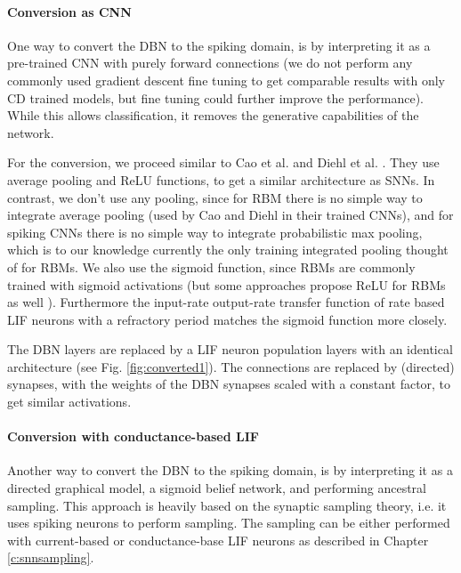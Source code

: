 \paragraph{Conversion as CNN}  \label{c:convascnn}

One way to convert the DBN to the spiking domain, is by interpreting it as a pre-trained CNN with purely forward connections (we do not perform any commonly used gradient descent fine tuning to get comparable results with only CD trained models, but fine tuning could further improve the performance).
While this allows classification, it removes the generative capabilities of the network.

For the conversion, we proceed similar to Cao et al. and Diehl et al. \cite{Cao2014} \cite{Diehl2015} .
They use average pooling and ReLU functions, to get a similar architecture as SNNs.
In contrast, we don't use any pooling, since for RBM there is no simple way to integrate average pooling (used by Cao and Diehl in their trained CNNs), and for spiking CNNs there is no simple way to integrate probabilistic max pooling, which is to our knowledge currently the only training integrated pooling thought of for RBMs.
We also use the sigmoid function, since RBMs are commonly trained with sigmoid activations (but some approaches propose ReLU for RBMs as well \cite{Nair2010}).
Furthermore the input-rate output-rate transfer function of rate based LIF neurons with a refractory period matches the sigmoid function more closely.

The DBN layers are replaced by a LIF neuron population layers with an identical architecture (see Fig. \ref{fig:converted1}). 
The connections are replaced by (directed) synapses, with the weights of the DBN synapses scaled with a constant factor, to get similar activations.
 

\paragraph{Conversion with conductance-based LIF} \label{c:convascoba}

Another way to convert the DBN to the spiking domain, is by interpreting it as a directed graphical model, a sigmoid belief network, and performing ancestral sampling.
This approach is heavily based on the synaptic sampling theory, i.e. it uses spiking neurons to perform sampling.
The sampling can be either performed with current-based or conductance-base LIF neurons as described in Chapter \ref{c:snnsampling}.

